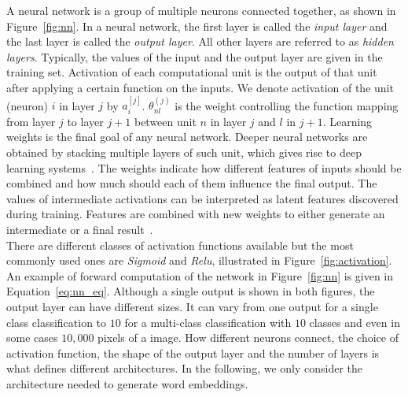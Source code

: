 A neural network is a group of multiple neurons connected together, as shown in Figure~\ref{fig:nn}. In a neural network, the first layer is called the \emph{input layer} and the last layer is called the \emph{output layer}. All other layers are referred to as \emph{hidden layers}.
Typically, the values of the input and the output layer are given in the training set. Activation of each computational unit is the output of that unit after applying a certain function on the inputs. We denote activation of the unit (neuron) $i$ in layer $j$ by $a_{i}^{[j]}$.
$\theta^{(j)}_{nl}$ is the weight controlling the function mapping from layer $j$ to layer $j+1$ between unit $n$ in layer $j$ and $l$ in $j+1$. Learning weights is the final goal of any neural network. Deeper neural networks are obtained by stacking multiple layers of such unit, which gives rise to deep learning systems~. 
%
The weights indicate how different features of inputs should be combined and how much should each of them influence the final output. The values of intermediate activations can be interpreted as latent features discovered during training. Features are combined with new weights to either generate an intermediate or a final result~. \\
There are different classes of activation functions available but the most commonly used ones are \emph{Sigmoid} and \emph{Relu}, illustrated in Figure~\ref{fig:activation}. An example of forward computation of the network in Figure~\ref{fig:nn} is given in Equation~\ref{eq:nn_eq}. Although a single output is shown in both figures, the output layer can have different sizes. It can vary from one output for a single class classification to $10$ for a multi-class classification with $10$ classes and even in some cases $10,000$ pixels of a image. How different neurons connect, the choice of activation function, the shape of the output layer and the number of layers is what defines different architectures. In the following, we only consider the architecture needed to generate word embeddings. 
